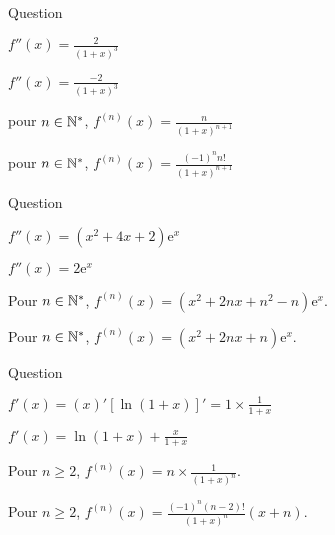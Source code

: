 \begin{multi}[multiple,feedback=
{On a \(\displaystyle f'(x)=\frac{-1}{(1+x)^2}\), \(\displaystyle f''(x)=\frac{2}{(1+x)^3}\) et l'on vérifie, par récurrence, que
\[\forall n\in \Nn^*,\; f^{(n)}(x)=\frac{(-1)^nn!}{(1+x)^{n+1}}.\]
}]{Question}
    \item* \(\displaystyle f''(x)=\frac{2}{(1+x)^3}\)
    \item \(\displaystyle f''(x)=\frac{-2}{(1+x)^3}\)
    \item pour \(n\in \mathbb{N}^*\), \(\displaystyle f^{(n)}(x)=\frac{n}{(1+x)^{n+1}}\)
    \item* pour \(n\in \mathbb{N}^*\), \(\displaystyle f^{(n)}(x)=\frac{(-1)^nn!}{(1+x)^{n+1}}\)
\end{multi}


\begin{multi}{Question}
    \item* \(\displaystyle f''(x)=(x^2+4x+2)\mathrm{e}^x\)
    \item \(\displaystyle f''(x)=2\mathrm{e}^x\)
    \item* Pour \(n\in \mathbb{N}^*\), \(\displaystyle f^{(n)}(x)=(x^2+2nx+n^2-n)\mathrm{e}^x\).
    \item Pour \(n\in \mathbb{N}^*\), \(\displaystyle f^{(n)}(x)=(x^2+2nx+n)\mathrm{e}^x\).
\end{multi}


\begin{multi}[multiple,feedback=
{On applique la formule de Leibniz 
\[\displaystyle f^{(n)}(x)=\sum _{k=0}^n\mathrm{C}_n^k(x)^{(k)}(\ln (1+x))^{(n-k)}.\]
Mais \(\displaystyle \left[\ln (1+x)\right]^{(k)}=\frac{(-1)^{k-1}(k-1)!}{(1+x)^k}\). Ce qui donne
\[f^{(n)}(x)=\frac{(-1)^{n}(n-2)!}{(1+x)^n}\left(x+n\right).\]
}]{Question}
    \item \(\displaystyle f'(x)=(x)'[\ln (1+x)]'=1\times \frac{1}{1+x}\)
    \item* \(\displaystyle f'(x)=\ln (1+x)+\frac{x}{1+x}\)
    \item Pour \(n\geq 2\), \(\displaystyle f^{(n)}(x)=n\times \frac{1}{(1+x)^n}\).
    \item* Pour \(n\geq 2\), \(\displaystyle f^{(n)}(x)=\frac{(-1)^{n}(n-2)!}{(1+x)^n}\left(x+n\right)\).
\end{multi}



